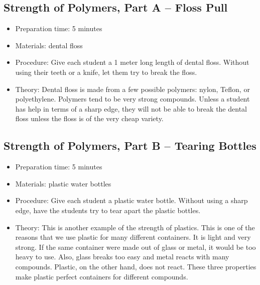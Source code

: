 \subsection{Strength of Polymers, Part A -- Floss Pull}
\begin{itemize}
\item{Preparation time: 5 minutes}
\item{Materials: dental floss}
\item{Procedure: Give each student a 1 meter long length of dental floss. Without using their teeth or a knife, let them try to break the floss.}
\item{Theory: Dental floss is made from a few possible polymers: nylon, Teflon, or polyethylene. Polymers tend to be very strong compounds. Unless a student has help in terms of a sharp edge, they will not be able to break the dental floss unless the floss is of the very cheap variety.}
\end{itemize}

\subsection{Strength of Polymers, Part B -- Tearing Bottles}
\begin{itemize}
\item{Preparation time: 5 minutes}
\item{Materials: plastic water bottles}
\item{Procedure: Give each student a plastic water bottle. Without using a sharp edge, have the students try to tear apart the plastic bottles.}
\item{Theory: This is another example of the strength of plastics. This is one of the reasons that we use plastic for many different containers. It is light and very strong. If the same container were made out of glass or metal, it would be too heavy to use. Also, glass breaks too easy and metal reacts with many compounds. Plastic, on the other hand, does not react. These three properties make plastic perfect containers for different compounds.}
\end{itemize}

